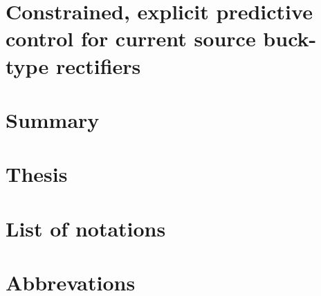 \documentclass[12pt, a4paper, oneside, table]{report}
\begin{document}
	\chapter{Constrained, explicit predictive control for current source buck-type rectifiers}
	

 \chapter{Summary}
 

 \chapter{Thesis}
 

 \chapter*{List of notations}
 

 \chapter*{Abbrevations}
 


 \newpage
 \pagestyle{plain}
 
 
\end{document}
